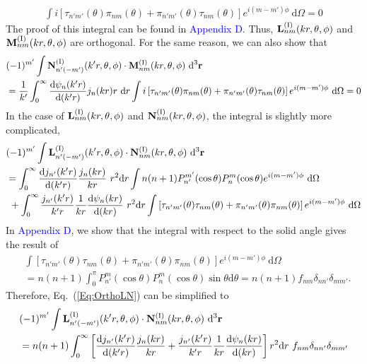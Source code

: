 \documentclass[journal=jacsat,manuscript=article,layout=traditional]{achemso}
\newcommand*\diff{\mathrm{d}}
\newcommand*\blue[1]{\textcolor{blue}{#1}}
\newcommand{\RomanI}{\scriptsize\textrm{I}}
\begin{document}
\begin{align}
    \int i
    \left[
    \tau_{n'm'}(\theta)\pi_{nm}(\theta)+
    \pi_{n'm'}(\theta)\tau_{nm}(\theta)
    \right]e^{i(m-m')\phi}~\diff\Omega=0
\end{align}
The proof of this integral can be found in \blue{Appendix D}.
Thus, $\vb{L}_{nm}^{(\RomanI)}(kr,\theta,\phi)$ and  $\vb{M}_{nm}^{(\RomanI)}(kr,\theta,\phi)$ are orthogonal.
For the same reason, we can also show that
\begin{align}
    \nonumber
    &(-1)^{m'}\int\vb{N}_{n'(-m')}^{(\RomanI)}(k'r,\theta,\phi)\cdot\vb{M}_{nm}^{(\RomanI)}(kr,\theta,\phi)~\diff^3\vb{r}\\
    &=
    \frac{1}{k'}\int_0^\infty \frac{\diff\psi_n(k'r)}{\diff{(k'r)}}j_n(kr)r~\diff{r}
    \int i
    \left[
    \tau_{n'm'}(\theta)\pi_{nm}(\theta)+
    \pi_{n'm'}(\theta)\tau_{nm}(\theta)
    \right]e^{i(m-m')\phi}~\diff\Omega=0
\end{align}
In the case of $\vb{L}_{nm}^{(\RomanI)}(kr,\theta,\phi)$ and $\vb{N}_{nm}^{(\RomanI)}(kr,\theta,\phi)$, the integral is slightly more complicated,
\begin{align}
    \nonumber
    &(-1)^{m'}\int\vb{L}_{n'(-m')}^{(\RomanI)}(k'r,\theta,\phi)\cdot\vb{N}_{nm}^{(\RomanI)}(kr,\theta,\phi)~\diff^3\vb{r}\\
    \nonumber
    &=
    \int_0^\infty
    \frac{\diff j_{n'}(k'r)}{\diff{(k'r)}}
    \frac{j_n(kr)}{kr}
    ~r^2\diff{r}
    \int n(n+1)P_{n'}^{m'}(\cos\theta)P_n^m(\cos\theta)
    e^{i(m-m')\phi}~\diff\Omega
    \\
    &~+
    \int_0^\infty
    \frac{j_{n'}(k'r)}{k'r}
    \frac{1}{kr}\frac{\diff\psi_n(kr)}{\diff{(kr)}}
    ~r^2\diff{r}
    \int
    \left[
    \tau_{n'm'}(\theta)\tau_{nm}(\theta)+
    \pi_{n'm'}(\theta)\pi_{nm}(\theta)
    \right]e^{i(m-m')\phi}~\diff\Omega
    \label{Eq:OrthoLN}
\end{align}
In \blue{Appendix D}, we show that the integral with respect to the solid angle gives the result of
\begin{align}
    \nonumber
    &\int \left[
    \tau_{n'm'}(\theta)\tau_{nm}(\theta)+
    \pi_{n'm'}(\theta)\pi_{nm}(\theta)
    \right]e^{i(m-m')\phi}~\diff\Omega\\
    &=
    n(n+1)\int_0^\pi P_{n'}^m(\cos\theta)P_n^m(\cos\theta)
    \sin\theta\diff\theta
    =n(n+1)f_{nm}\delta_{nn'}\delta_{mm'}.
    \label{Eq:OrthoAngle}
\end{align}
Therefore, Eq.~(\ref{Eq:OrthoLN}) can be simplified to
\begin{align}
    \nonumber
    &(-1)^{m'}\int\vb{L}_{n'(-m')}^{(\RomanI)}(k'r,\theta,\phi)\cdot\vb{N}_{nm}^{(\RomanI)}(kr,\theta,\phi)~\diff^3\vb{r}\\
    &=
    n(n+1)\int_0^\infty
    \left[
    \frac{\diff j_{n'}(k'r)}{\diff{(k'r)}}
    \frac{j_n(kr)}{kr}+
    \frac{j_{n'}(k'r)}{k'r}
    \frac{1}{kr}\frac{\diff\psi_n(kr)}{\diff{(kr)}}
    \right]r^2\diff{r}
    ~f_{nm}\delta_{nn'}\delta_{mm'}
\end{align}
\end{document}
